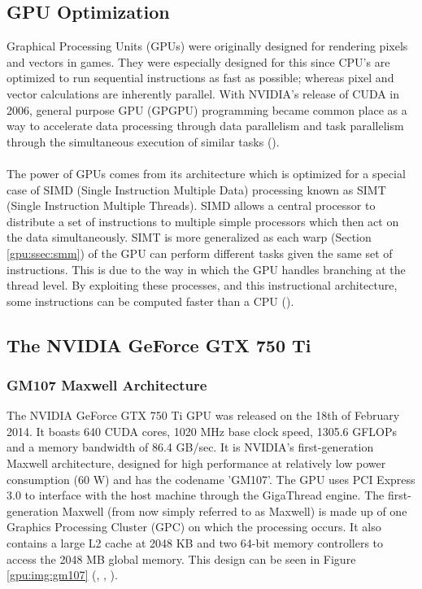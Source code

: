 \subsection{GPU Optimization}\label{gpu:sec:opt}
Graphical Processing Units (GPUs) were originally designed for rendering pixels and vectors in games. They were especially designed for this since CPU's are optimized to run sequential instructions as fast as possible; whereas pixel and vector calculations are inherently parallel. With NVIDIA's release of CUDA in 2006, general purpose GPU (GPGPU) programming became common place as a way to accelerate data processing through data parallelism and task parallelism through the simultaneous execution of similar tasks (\cite{nvidia_cuda}).
\\
\\
The power of GPUs comes from its architecture which is optimized for a special case of SIMD (Single Instruction Multiple Data) processing known as SIMT (Single Instruction Multiple Threads). SIMD allows a central processor to distribute a set of instructions to multiple simple processors which then act on the data simultaneously. SIMT is more generalized as each warp (Section \ref{gpu:ssec:smm}) of the GPU can perform different tasks given the same set of instructions. This is due to the way in which the GPU handles branching at the thread level. By exploiting these processes, and this instructional architecture, some instructions can be computed faster than a CPU (\cite{vuduc2013brief}).
\subsection{The NVIDIA GeForce GTX 750 Ti}\label{gpu:sec:750}
%
\subsubsection{GM107 Maxwell Architecture}\label{gpu:ssec:max}
The NVIDIA GeForce GTX 750 Ti GPU was released on the 18th of February 2014. It boasts 640 CUDA cores, 1020 MHz base clock speed, 1305.6 GFLOPs and a memory bandwidth of 86.4 GB/sec. It is NVIDIA's first-generation Maxwell architecture, designed for high performance at relatively low power consumption (60 W) and has the codename 'GM107'. The GPU uses PCI Express 3.0 to interface with the host machine through the GigaThread engine. The first-generation Maxwell (from now simply referred to as Maxwell) is made up of one Graphics Processing Cluster (GPC) on which the processing occurs. It also contains a large L2 cache at 2048 KB and two 64-bit memory controllers to access the 2048 MB global memory. This design can be seen in Figure \ref{gpu:img:gm107} (\cite{geforce_750}, \cite{g750_specs}, \cite{g750_paper}).
%
